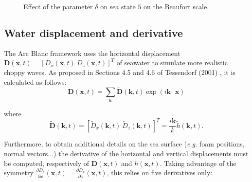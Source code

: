 \documentclass[final]{jcgt}
\def\Framework{The Arc Blanc framework\xspace}
\begin{document}
\begin{figure}[htbp]
	\centering

	\hfill
	\caption{Effect of the parameter $\delta$ on sea state $5$ on the Beaufort scale.}
	\label{fig:dispersionEffect}
\end{figure}

\subsection{Water displacement and derivative}
\label{subsec:water_displacement_and_derivative}
\Framework uses the horizontal displacement $\mathbf{D}(\mathbf x,t) = \left[D_x(\mathbf x,t)\ D_z(\mathbf x,t)\right]^T$ of seawater to simulate more realistic choppy waves.
As proposed in Sections 4.5 and 4.6 of Tessendorf (2001) \cite{tessendorfSimulating2001}, it is calculated as follows:
\begin{equation}\label{equa:hori-displacement}
	\mathbf{D}(\mathbf x,t) = \sum_{\mathbf{k}} \mathbf{\tilde{D}}(\mathbf k,t)\exp\left(i\mathbf{k}\cdot\mathbf x\right)
\end{equation}

where
\begin{equation}\label{equa:hori-displacement-k}
	\mathbf{\tilde{D}}(\mathbf k,t) = \left[\tilde{D}_x(\mathbf k,t)\ \tilde{D}_z(\mathbf k,t)\right]^T = \frac{i\mathbf{k}}{k} \tilde{h}(\mathbf{k}, t).
\end{equation}

Furthermore, to obtain additional details on the sea surface (\emph{e.g.} foam positions, normal vectors...) the derivative of the horizontal and vertical displacements must be computed, respectively of $\mathbf{D}(\mathbf x,t)$ and $h(\mathbf x,t)$.
Taking advantage of the symmetry $\frac{\partial D_z}{\partial x}(\mathbf x,t) = \frac{\partial D_x}{\partial z}(\mathbf x,t)$, this relies on five derivatives only:
\end{document}
